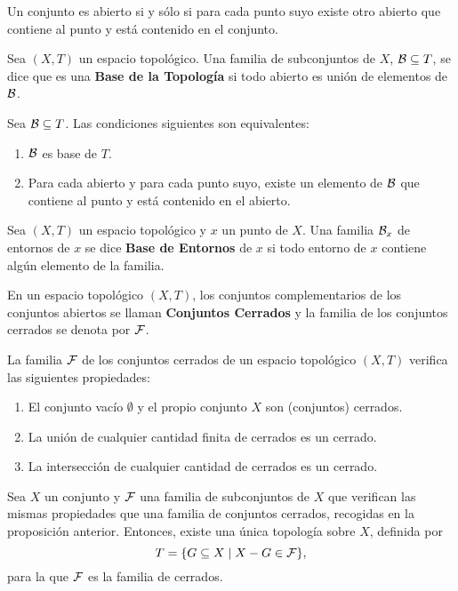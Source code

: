 \documentclass[cursovd_portada.tex]{subfiles}
\begin{document}
\begin{prop}
Un conjunto es abierto si y sólo si para cada punto suyo existe otro abierto que contiene al punto y está
contenido en el conjunto.
\end{prop}
\begin{defi}
Sea $(X,T)$ un espacio topológico. Una familia de subconjuntos de $X$, ${\cal B}\subseteq T$, se dice que es una
{\bf Base de la Topología} si todo abierto es unión de elementos de ${\cal B}$.
\end{defi}
\begin{teorema}
Sea ${\cal B}\subseteq T$. Las condiciones siguientes son equivalentes:
\begin{enumerate}
\item ${\cal B}$ es base de $T$.
\item Para cada abierto y para cada punto suyo, existe un elemento de ${\cal B}$ que contiene al punto y está
contenido en el abierto.
\end{enumerate}
\end{teorema}
\begin{defi}
Sea $(X,T)$ un espacio topológico y $x$ un punto de $X$. Una familia ${\cal B}_x$ de entornos de $x$ se dice {\bf
Base de Entornos} de $x$ si todo entorno de $x$ contiene algún elemento de la familia.
\end{defi}
\begin{defi}
En un espacio topológico $(X,T)$, los conjuntos complementarios de los conjuntos abiertos se llaman {\bf Conjuntos
Cerrados} y la familia de los conjuntos cerrados se denota por ${\cal F}$.
\end{defi}
\begin{prop}
La familia ${\cal F}$ de los conjuntos cerrados de un espacio to\-po\-ló\-gi\-co $(X,T)$ verifica las siguientes
propiedades:
\begin{enumerate}
\item El conjunto vacío $\emptyset$ y el propio conjunto $X$ son (conjuntos) cerrados.
\item La unión de cualquier cantidad finita de cerrados es un cerrado.
\item La intersección de cualquier cantidad de cerrados es un cerrado.
\end{enumerate}
\end{prop}
\begin{teorema}
Sea $X$ un conjunto y ${\cal F}$ una familia de subconjuntos de $X$ que verifican las mismas propiedades que una
familia de conjuntos cerrados, recogidas en la proposición anterior. Entonces, existe una única topología sobre
$X$, definida por
$$T=\{G\subseteq X\mid X-G\in{\cal F}\},$$
para la que ${\cal F}$ es la familia de cerrados.
\end{teorema}
\end{document}
